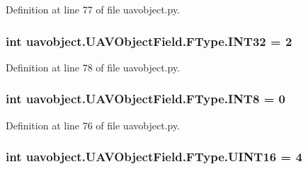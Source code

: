 Definition at line 77 of file uavobject.\-py.

\hypertarget{classuavobject_1_1_u_a_v_object_field_1_1_f_type_aaf033821f6e501ae8e698056e7312ce0}{
\subsubsection[{I\-N\-T32}]{\setlength{\rightskip}{0pt plus 5cm}int uavobject.\-U\-A\-V\-Object\-Field.\-F\-Type.\-I\-N\-T32 = 2\hspace{0.3cm}{\ttfamily [static]}}}\label{classuavobject_1_1_u_a_v_object_field_1_1_f_type_aaf033821f6e501ae8e698056e7312ce0}


Definition at line 78 of file uavobject.\-py.

\hypertarget{classuavobject_1_1_u_a_v_object_field_1_1_f_type_ac5910f572723b877215aa253835b90c2}{
\subsubsection[{I\-N\-T8}]{\setlength{\rightskip}{0pt plus 5cm}int uavobject.\-U\-A\-V\-Object\-Field.\-F\-Type.\-I\-N\-T8 = 0\hspace{0.3cm}{\ttfamily [static]}}}\label{classuavobject_1_1_u_a_v_object_field_1_1_f_type_ac5910f572723b877215aa253835b90c2}


Definition at line 76 of file uavobject.\-py.

\hypertarget{classuavobject_1_1_u_a_v_object_field_1_1_f_type_a85cd16d14436cb2775e4896d3d6ded7c}{
\subsubsection[{U\-I\-N\-T16}]{\setlength{\rightskip}{0pt plus 5cm}int uavobject.\-U\-A\-V\-Object\-Field.\-F\-Type.\-U\-I\-N\-T16 = 4\hspace{0.3cm}{\ttfamily [static]}}}\label{classuavobject_1_1_u_a_v_object_field_1_1_f_type_a85cd16d14436cb2775e4896d3d6ded7c}


